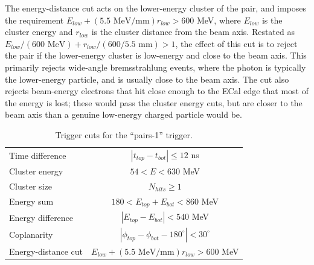 The energy-distance cut acts on the lower-energy cluster of the pair, and imposes the requirement $E_{low}+(5.5\text{ MeV/mm})r_{low}>600$ MeV, where $E_{low}$ is the cluster energy and $r_{low}$ is the cluster distance from the beam axis.
Restated as $E_{low}/(600\text{ MeV})+r_{low}/(600/5.5\text{ mm})>1$, the effect of this cut is to reject the pair if the lower-energy cluster is low-energy and close to the beam axis.
This primarily rejects wide-angle bremsstrahlung events, where the photon is typically the lower-energy particle, and is usually close to the beam axis.
The cut also rejects beam-energy electrons that hit close enough to the ECal edge that most of the energy is lost; these would pass the cluster energy cuts, but are closer to the beam axis than a genuine low-energy charged particle would be.

\begin{table}[htp]
    \begin{center}
        \caption{Trigger cuts for the ``pairs-1'' trigger.
        }
        \begin{tabular}{lc}   
            \hline \hline
            Time difference & $|t_{top}-t_{bot}|\le12$ ns \\
            Cluster energy & $54<E<630$ MeV \\
            Cluster size & $N_{hits}\ge 1$ \\
            Energy sum & $180<E_{top}+E_{bot}<860$ MeV \\
            Energy difference & $|E_{top}-E_{bot}|<540$ MeV \\
            Coplanarity & $|\phi_{top}-\phi_{bot}-180^\circ|<30^\circ$ \\
            Energy-distance cut & $E_{low}+(5.5\text{ MeV/mm})r_{low}>600$ MeV \\
            \hline \hline
        \end{tabular}
        \label{tab:trigger_cuts} 
    \end{center}
\end{table}


